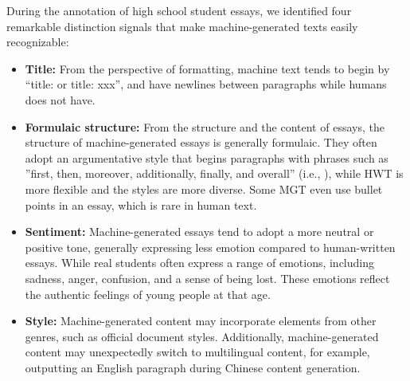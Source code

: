 During the annotation of high school student essays, we identified four remarkable distinction signals that make machine-generated texts easily recognizable:
\begin{itemize}
    \item \textbf{Title:} From the perspective of formatting, machine text tends to begin by ``title:  or title: xxx'', and have newlines between paragraphs while humans does not have.
    
    \item \textbf{Formulaic structure:} From the structure and the content of essays, the structure of machine-generated essays is generally formulaic. They often adopt an argumentative style that begins paragraphs with phrases such as ''first, then, moreover, additionally, finally, and overall'' (i.e., ), while HWT is more flexible and the styles are more diverse. Some MGT even use bullet points in an essay, which is rare in human text.

    \item \textbf{Sentiment:} Machine-generated essays tend to adopt a more neutral or positive tone, generally expressing less emotion compared to human-written essays. While real students often express a range of emotions, including sadness, anger, confusion, and a sense of being lost. These emotions reflect the authentic feelings of young people at that age.
    
    \item \textbf{Style:} Machine-generated content may incorporate elements from other genres, such as official document styles. Additionally, machine-generated content may unexpectedly switch to multilingual content, for example, outputting an English paragraph during Chinese content generation.
\end{itemize}

